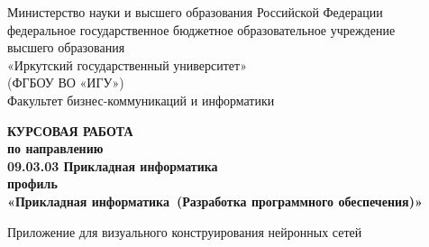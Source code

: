 \thispagestyle{titlepage}

    \begin{center}
    \linespread{1}
		Министерство науки и высшего образования  Российской Федерации\\
федеральное государственное бюджетное образовательное учреждение\\
высшего образования\\
«Иркутский государственный университет»\\
(ФГБОУ ВО «ИГУ»)\\
Факультет бизнес-коммуникаций и информатики 
    \end{center}
\vspace{1cm}    
\hspace{8cm} 
\begin{minipage}{0.5\textwidth}
\linespread{1}
  \begin{flushleft}
		
		
		\end{flushleft}
\end{minipage}


    \vspace{2cm} %
    \begin{center}
   {\bf КУРСОВАЯ РАБОТА\\
    по направлению  \\
		09.03.03 Прикладная информатика\\
		профиль\\
		«Прикладная информатика~(Разработка программного обеспечения)»\\}
    \end{center}
		
    \begin{center}
  		Приложение для визуального конструирования нейронных сетей\\
    \end{center}
		
		\vspace{2.5em}
		
   \hspace{-5em} 


